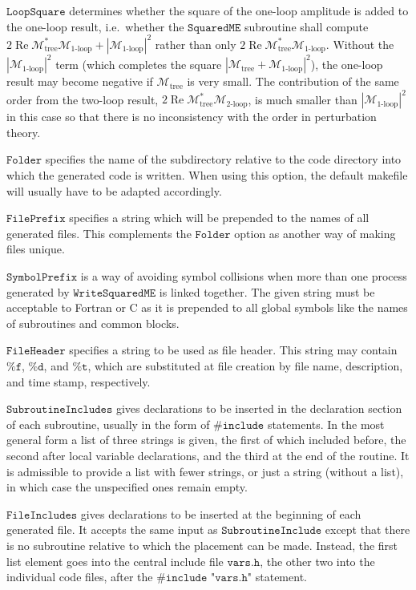 \documentclass[twoside,11pt]{article}
\def\Code#1{\ensuremath{\texttt{#1}}}
\def\limfunc#1{\mathop{\mathrm{#1}}}
\def\Re{\limfunc{Re}}
\def\ie{i.e.\ }
\def\M{\mathcal{M}}
\def\Mtree{\M_{\text{tree}}}
\def\Mloop{\M_{\text{1-loop}}}
\begin{document}
\Code{LoopSquare} determines whether the square of the one-loop
amplitude is added to the one-loop result, \ie whether the
\Code{SquaredME} subroutine shall compute $2\Re\Mtree^*\Mloop +
|\Mloop|^2$ rather than only $2\Re\Mtree^*\Mloop$.  Without the
$|\Mloop|^2$ term (which completes the square $|\Mtree + \Mloop|^2$),
the one-loop result may become negative if $\Mtree$ is very small.  The
contribution of the same order from the two-loop result, $2\Re\Mtree^*
\M_{\text{2-loop}}$, is much smaller than $|\Mloop|^2$ in this case so
that there is no inconsistency with the order in perturbation theory.

\Code{Folder} specifies the name of the subdirectory relative to the
code directory into which the generated code is written.  When using
this option, the default makefile will usually have to be adapted
accordingly.

\Code{FilePrefix} specifies a string which will be prepended to the
names of all generated files.  This complements the \Code{Folder} option
as another way of making files unique.

\Code{SymbolPrefix} is a way of avoiding symbol collisions when more than
one process generated by \Code{WriteSquaredME} is linked together.  The
given string must be acceptable to Fortran or C as it is prepended to all
global symbols like the names of subroutines and common blocks.

\Code{FileHeader} specifies a string to be used as file header.  This 
string may contain \Code{\%f}, \Code{\%d}, and \Code{\%t}, which are 
substituted at file creation by file name, description, and time stamp, 
respectively.

\Code{SubroutineIncludes} gives declarations to be inserted in the 
declaration section of each subroutine, usually in the form of 
\Code{\#include} statements.  In the most general form a list of three 
strings is given, the first of which included before, the second after 
local variable declarations, and the third at the end of the routine.  
It is admissible to provide a list with fewer strings, or just a string 
(without a list), in which case the unspecified ones remain empty.

\Code{FileIncludes} gives declarations to be inserted at the beginning 
of each generated file.  It accepts the same input as 
\Code{SubroutineInclude} except that there is no subroutine relative to 
which the placement can be made.  Instead, the first list element goes 
into the central include file \Code{vars.h}, the other two into the 
individual code files, after the \Code{\#include "vars.h"} statement.
\end{document}
